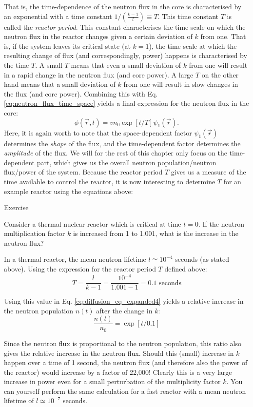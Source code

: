That is, the time-dependence of the neutron flux in the core is characterised by an exponential with a time constant $1/\left(\frac{k-1}{l}\right) \equiv T$. This time constant $T$ is called the \emph{reactor period}. This constant characterises the time scale on which the neutron flux in the reactor changes given a certain deviation of $k$ from one. That is, if the system leaves its critical state (at $k=1$), the time scale at which the resulting change of flux (and correspondingly, power) happens is characterised by the time $T$. A small $T$ means that even a small deviation of $k$ from one will result in a rapid change in the neutron flux (and core power). A large $T$ on the other hand means that a small deviation of $k$ from one will result in slow changes in the flux (and core power). Combining this with Eq. \ref{eq:neutron_flux_time_space} yields a final expression for the neutron flux in the core:
\begin{equation}
	\phi(\vec{r}, t) = v n_0 \exp [t/T] \psi_1(\vec{r}).
\end{equation}
Here, it is again worth to note that the space-dependent factor $\psi_1(\vec{r})$ determines the \emph{shape} of the flux, and the time-dependent factor determines the \emph{amplitude} of the flux. We will for the rest of this chapter only focus on the time-dependent part, which gives us the overall neutron population/neutron flux/power of the system. Because the reactor period $T$ gives us a measure of the time available to control the reactor, it is now interesting to determine $T$ for an example reactor using the equations above:
\begin{tcolorbox}
Exercise

Consider a thermal nuclear reactor which is critical at time $t = 0$. If the neutron multiplication factor $k$ is increased from 1 to 1.001, what is the increase in the neutron flux?

	In a thermal reactor, the mean neutron lifetime $l \simeq 10^{-4}$ seconds (as stated above). Using the expression for the reactor period $T$ defined above:
	\[
		T = \frac{l}{k-1} = \frac{10^{-4}}{1.001 - 1} = 0.1\text{ seconds}
	\]

	Using this value in Eq. \ref{eq:diffusion_eq_expanded4} yields a relative increase in the neutron population $n(t)$ after the change in $k$:
	\[
		\frac{n(t)}{n_0} = \exp[t/0.1]
	\]

	Since the neutron flux is proportional to the neutron population, this ratio also gives the relative increase in the neutron flux. Should this (small) increase in $k$ happen over a time of 1 second, the neutron flux (and therefore also the power of the reactor) would increase by a factor of 22,000! Clearly this is a very large increase in power even for a small perturbation of the multiplicity factor $k$. You can yourself perform the same calculation for a fast reactor with a mean neutron lifetime of $l \simeq 10^{-7}$ seconds.
\end{tcolorbox}

